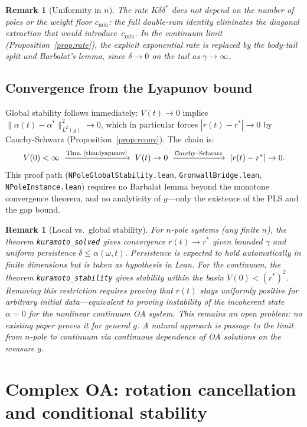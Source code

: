 \documentclass[11pt,a4paper]{article}
\newtheorem{remark}[theorem]{Remark}
\theoremstyle{definition}
\begin{document}
\begin{remark}[Uniformity in $n$]
The rate $K\delta\delta^*$ does not depend on the number of poles or the weight floor $c_{\min}$: the full double-sum identity eliminates the diagonal extraction that would introduce~$c_{\min}$. In the continuum limit (Proposition~\ref{prop:rate}), the explicit exponential rate is replaced by the body-tail split and Barbalat's lemma, since $\delta \to 0$ on the tail as $\gamma \to \infty$.
\end{remark}

\subsection{Convergence from the Lyapunov bound}

Global stability follows immediately: $V(t) \to 0$ implies $\|\alpha(t) - \alpha^*\|^2_{L^2(g)} \to 0$, which in particular forces $|r(t) - r^*| \to 0$ by Cauchy-Schwarz (Proposition~\ref{prop:rconv}). The chain is:
\[
V(0) < \infty \;\xrightarrow{\text{Thm.~\ref{thm:lyapunov}}}\; V(t) \to 0 \;\xrightarrow{\text{Cauchy--Schwarz}}\; |r(t) - r^*| \to 0.
\]
This proof path (\texttt{NPoleGlobalStability.lean}, \texttt{GronwallBridge.lean}, \texttt{NPoleInstance.lean}) requires no Barbalat lemma beyond the monotone convergence theorem, and no analyticity of $g$---only the existence of the PLS and the gap bound.

\begin{remark}[Local vs.\ global stability]
For $n$-pole systems (any finite $n$), the theorem \texttt{kuramoto\_solved} gives convergence $r(t) \to r^*$ given bounded $\gamma$ and uniform persistence $\delta \leq \alpha(\omega,t)$. Persistence is expected to hold automatically in finite dimensions but is taken as hypothesis in Lean. For the continuum, the theorem \texttt{kuramoto\_stability} gives stability within the basin $V(0) < (r^*)^2$. Removing this restriction requires proving that $r(t)$ stays uniformly positive for arbitrary initial data---equivalent to proving instability of the incoherent state $\alpha = 0$ for the nonlinear continuum OA system. This remains an open problem: no existing paper proves it for general $g$. A natural approach is passage to the limit from $n$-pole to continuum via continuous dependence of OA solutions on the measure $g$.
\end{remark}

\section{Complex OA: rotation cancellation and conditional stability}\label{sec:complex-extension}
\end{document}
